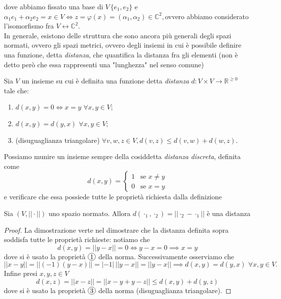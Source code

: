 \documentclass[12pt, twoside, italian, openany]{book}
\begin{document}
	dove abbiamo fissato una base di $V \, \{e_1, e_2 \}$ e $\alpha_1 e_1 + \alpha_2 e_2 = x \in V \iff z = \varphi(x) = (\alpha_1, \alpha_2) \in \mathbb{C}^2, $ovvero abbiamo considerato l'isomorfismo fra $V \longleftrightarrow \mathbb{C}^2$. \\
	In generale, esistono delle struttura che sono ancora più generali degli spazi normati, ovvero gli spazi metrici, ovvero degli insiemi in cui è possibile definire una funzione, detta \emph{distanza}, che quantifica la distanza fra gli elementi (non è detto però che essa rappresenti una "lunghezza" nel senso comune)
	\begin{definition}
		Sia $V$ un insieme su cui è definita una funzione detta \emph{distanza} $d: V \times V \to \mathbb{R}^{\geq 0}$ tale che:
		\begin{enumerate}[label=\protect\circled{\arabic*}]
			\item $d(x, y) = 0 \iff x = y \, \, \forall x, y \in V$;
			\item $d(x, y) = d(y,x) \, \, \forall x, y \in V$;
			\item (disuguaglianza triangolare) $\forall v, w, z \in V, d(v, z) \leq d(v,w)+d(w, z)$.
		\end{enumerate}
	\end{definition} 
	\begin{remark}
		Possiamo munire un insieme sempre della cosiddetta \emph{distanza discreta}, definita come
		$$
		d(x, y) = \begin{cases}
			1 & \text{se } x \neq y \\
			0 & \text{se } x = y
		\end{cases}
		$$
		e verificare che essa possiede tutte le proprietà richiesta dalla definizione
	\end{remark}
	\begin{prop}
		Sia $(V, ||\cdot||)$ uno spazio normato. Allora $d(\cdot_1, \cdot_2) = ||\cdot_2 - \cdot_1||$ è una distanza
	\end{prop}
	\begin{proof}
		La dimostrazione verte nel dimostrare che la distanza definita sopra soddisfa tutte le proprietà richieste: notiamo che
		$$
		d(x, y) = ||y-x|| = 0 \iff y - x = 0 \implies x = y
		$$
		dove si è usato la proprietà $\circled{1}$ della norma. Successivamente osserviamo che
		$$
		||x-y|| = ||(-1)(y-x)|| = |-1| \, ||y-x|| = ||y-x|| \implies d(x, y) = d(y, x) \, \, \forall x, y \in V.
		$$
		Infine presi $x, y, z \in V$
		$$
			d(x, z) = ||x-z|| = ||x-y+y-z|| \leq d(x, y) + d(y, z)
		$$
		dove si è usato la proprietà $\circled{3}$ della norma (disuguaglianza triangolare).
	\end{proof}
\end{document}
